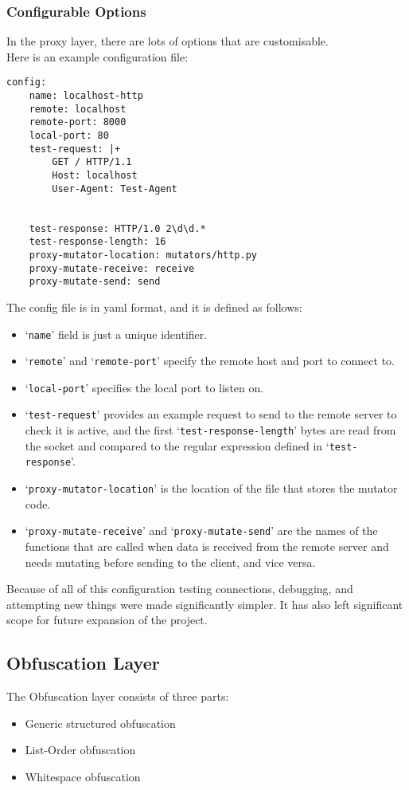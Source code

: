 \subsubsection{Configurable Options}
In the proxy layer, there are lots of options that are customisable.\\
Here is an example configuration file:
\begin{verbatim}
config:
    name: localhost-http
    remote: localhost
    remote-port: 8000
    local-port: 80
    test-request: |+
        GET / HTTP/1.1
        Host: localhost
        User-Agent: Test-Agent


    test-response: HTTP/1.0 2\d\d.*
    test-response-length: 16
    proxy-mutator-location: mutators/http.py
    proxy-mutate-receive: receive
    proxy-mutate-send: send
\end{verbatim}
The config file is in yaml format, and it is defined as follows:
\begin{itemize}
\item `\texttt{name}' field is just a unique identifier.
\item `\texttt{remote}' and `\texttt{remote-port}' specify the remote host and port to connect to.
\item `\texttt{local-port}' specifies the local port to listen on.
\item `\texttt{test-request}' provides an example request to send to the remote server to check it is active, and the first `\texttt{test-response-length}' bytes are read from the socket and compared to the regular expression defined in `\texttt{test-response}'.
\item `\texttt{proxy-mutator-location}' is the location of the file that stores the mutator code.
\item `\texttt{proxy-mutate-receive}' and `\texttt{proxy-mutate-send}' are the names of the functions that are called when data is received from the remote server and needs mutating before sending to the client, and vice versa.
\end{itemize}
Because of all of this configuration testing connections, debugging, and attempting new things were made significantly simpler. It has also left significant scope for future expansion of the project.

\subsection{Obfuscation Layer}
The Obfuscation layer consists of three parts:
\begin{itemize}
    \item Generic structured obfuscation
    \item List-Order obfuscation
    \item Whitespace obfuscation
\end{itemize}

